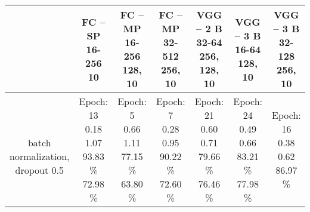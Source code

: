 \begin{center}
\begin{tabular}{ |c|c|c|c|c|c|c| }
\hline
& \thead{FC -- SP\\16-256\\10} & \thead{FC -- MP\\16-256\\128, 10} & \thead{FC -- MP\\32-512\\256, 10} & \thead{VGG -- 2 B\\32-64\\256, 128, 10} & \thead{VGG -- 3 B\\16-64\\128, 10} & \thead{VGG -- 3 B\\32-128\\256, 10} \\
\hline
\thead{\\batch\\normalization,\\dropout 0.5} & \makecell{
Epoch: 13 \\
0.18 \\
1.07 \\
93.83 \% \\
72.98 \% \\
} & \makecell{
Epoch: 5 \\
0.66 \\
1.11 \\
77.15 \% \\
63.80 \% \\
} & \makecell{
Epoch: 7 \\
0.28 \\
0.95 \\
90.22 \% \\
72.60 \% \\
} & \makecell{
Epoch: 21 \\
0.60 \\
0.71 \\
79.66 \% \\
76.46 \% \\
} & \makecell{
Epoch: 24 \\
0.49 \\
0.66 \\
83.21 \% \\
77.98 \% \\
} & \makecell{
Epoch: 16 \\
0.38 \\
0.62 \\
86.97 \% \\
}
\end{tabular}
\end{center}

